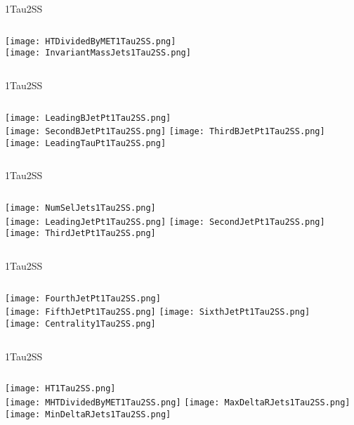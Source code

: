 \documentclass{beamer}
\begin{document}
\begin{frame}{1Tau2SS}
    \begin{columns}[t]
    \centering
    \texttt{[image: HTDividedByMET1Tau2SS.png]}\\
    \centering
    \texttt{[image: InvariantMassJets1Tau2SS.png]}
    \end{columns}
\end{frame}
\begin{frame}{1Tau2SS}
    \begin{columns}[t]
    \centering
    \texttt{[image: LeadingBJetPt1Tau2SS.png]}\\
    \texttt{[image: SecondBJetPt1Tau2SS.png]}
    \centering
    \texttt{[image: ThirdBJetPt1Tau2SS.png]}\\
    \texttt{[image: LeadingTauPt1Tau2SS.png]}
    \end{columns}
\end{frame}
\begin{frame}{1Tau2SS}
    \begin{columns}[t]
    \centering
    \texttt{[image: NumSelJets1Tau2SS.png]}\\
    \texttt{[image: LeadingJetPt1Tau2SS.png]}
    \centering
    \texttt{[image: SecondJetPt1Tau2SS.png]}\\
    \texttt{[image: ThirdJetPt1Tau2SS.png]}
    \end{columns}
\end{frame}
\begin{frame}{1Tau2SS}
    \begin{columns}[t]
    \centering
    \texttt{[image: FourthJetPt1Tau2SS.png]}\\
    \texttt{[image: FifthJetPt1Tau2SS.png]}
    \centering
    \texttt{[image: SixthJetPt1Tau2SS.png]}\\
    \texttt{[image: Centrality1Tau2SS.png]}
    \end{columns}
\end{frame}
\begin{frame}{1Tau2SS}
    \begin{columns}[t]
    \centering
    \texttt{[image: HT1Tau2SS.png]}\\
    \texttt{[image: MHTDividedByMET1Tau2SS.png]}
    \centering
    \texttt{[image: MaxDeltaRJets1Tau2SS.png]}\\
    \texttt{[image: MinDeltaRJets1Tau2SS.png]}
    \end{columns}
\end{frame}
\end{document}
